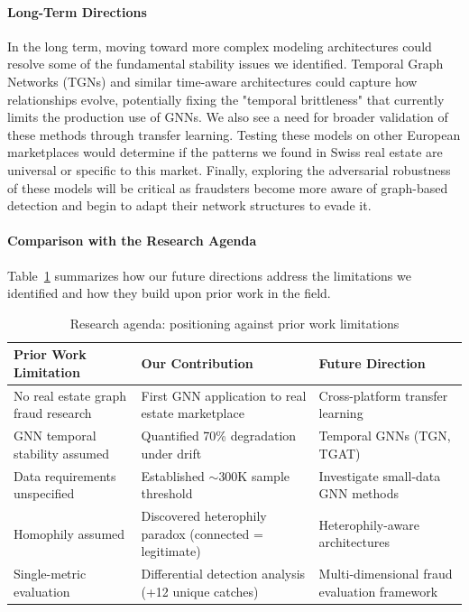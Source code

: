 \paragraph{Long-Term Directions}
In the long term, moving toward more complex modeling architectures could resolve some of the fundamental stability issues we identified. Temporal Graph Networks (TGNs) and similar time-aware architectures could capture how relationships evolve, potentially fixing the "temporal brittleness" that currently limits the production use of GNNs. We also see a need for broader validation of these methods through transfer learning. Testing these models on other European marketplaces would determine if the patterns we found in Swiss real estate are universal or specific to this market. Finally, exploring the adversarial robustness of these models will be critical as fraudsters become more aware of graph-based detection and begin to adapt their network structures to evade it.

\paragraph{Comparison with the Research Agenda}
Table~\ref{tab:6_4_comparison} summarizes how our future directions address the limitations we identified and how they build upon prior work in the field.

\begin{table}[h]
\centering
\caption{Research agenda: positioning against prior work limitations}
\label{tab:6_4_comparison}
\begin{tabular}{p{4cm}p{4cm}p{5cm}}
\toprule
\textbf{Prior Work Limitation} & \textbf{Our Contribution} & \textbf{Future Direction} \\
\midrule
No real estate graph fraud research \cite{mutemi2024ecommerce,cherif2024financial} & First GNN application to real estate marketplace & Cross-platform transfer learning \\
\addlinespace
GNN temporal stability assumed & Quantified 70\% degradation under drift & Temporal GNNs (TGN, TGAT) \\
\addlinespace
Data requirements unspecified \cite{dou2020enhancing} & Established $\sim$300K sample threshold & Investigate small-data GNN methods \\
\addlinespace
Homophily assumed \cite{kipf2017semi} & Discovered heterophily paradox (connected = legitimate) & Heterophily-aware architectures \\
\addlinespace
Single-metric evaluation & Differential detection analysis (+12 unique catches) & Multi-dimensional fraud evaluation framework \\
\bottomrule
\end{tabular}
\end{table}
